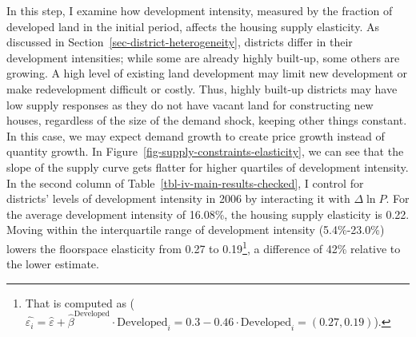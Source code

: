 \documentclass[
  12pt,
]{article}
\begin{document}
In this step, I examine how development intensity, measured by the
fraction of developed land in the initial period, affects the housing
supply elasticity. As discussed in
Section~\ref{sec-district-heterogeneity}, districts differ in their
development intensities; while some are already highly built-up, some
others are growing. A high level of existing land development may limit
new development or make redevelopment difficult or costly. Thus, highly
built-up districts may have low supply responses as they do not have
vacant land for constructing new houses, regardless of the size of the
demand shock, keeping other things constant. In this case, we may expect
demand growth to create price growth instead of quantity growth. In
Figure~\ref{fig-supply-constraints-elasticity}, we can see that the
slope of the supply curve gets flatter for higher quartiles of
development intensity. In the second column of
Table~\ref{tbl-iv-main-results-checked}, I control for districts' levels
of development intensity in 2006 by interacting it with \(\Delta\ln P\).
For the average development intensity of 16.08\%, the housing supply
elasticity is 0.22. Moving within the interquartile range of development
intensity (5.4\%-23.0\%) lowers the floorspace elasticity from 0.27 to
0.19\footnote{That is computed as
  (\(\widehat{\varepsilon_i} = \widehat{\varepsilon} + \widehat{\beta}^{\text{Developed}}\cdot\text{Developed}_i = 0.3 -0.46 \cdot\text{Developed}_i = (0.27, 0.19)\)).},
a difference of 42\% relative to the lower estimate.
\end{document}
